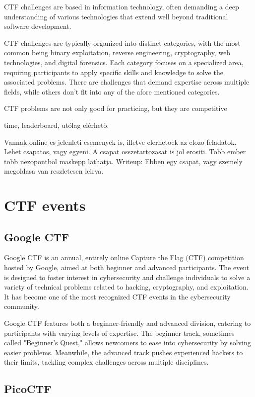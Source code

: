 \documentclass[conference]{IEEEtran}
\begin{document}
CTF challenges are based in information technology, often demanding a deep
understanding of various technologies that extend well beyond traditional
software development.

CTF challenges are typically organized into distinct categories, with the most
common being binary exploitation, reverse engineering, cryptography, web
technologies, and digital forensics. Each category focuses on a specialized
area, requiring participants to apply specific skills and knowledge to solve
the associated problems. There are challenges that demand expertise across multiple
fields, while others don't fit into any of the afore mentioned categories.

CTF problems are not only good for practicing, but they are competitive

time, leaderboard, utólag elérhető.

Vannak online es jelenleti esemenyek
is, illetve elerhetoek az elozo feladatok. Lehet csapatos, vagy egyeni.
A csapat osszetartozasat is jol erositi. Tobb ember tobb nezopontbol maskepp lathatja.
Writeup: Ebben egy csapat, vagy szemely megoldasa van reszletesen leirva.

\section{CTF events}

\subsection{Google CTF}

Google CTF is an annual, entirely online Capture the Flag (CTF) competition hosted by Google,
aimed at both beginner and advanced participants. The event is designed to
foster interest in cybersecurity and challenge individuals to solve a variety
of technical problems related to hacking, cryptography, and exploitation. It
has become one of the most recognized CTF events in the cybersecurity
community.

Google CTF features both a beginner-friendly and advanced division, catering to
participants with varying levels of expertise. The beginner track, sometimes
called "Beginner's Quest," allows newcomers to ease into cybersecurity by
solving easier problems. Meanwhile, the advanced track pushes experienced
hackers to their limits, tackling complex challenges across multiple
disciplines.

\subsection{PicoCTF}
\end{document}
